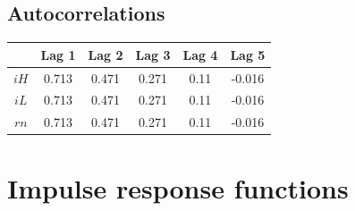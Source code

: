 \subsection{Autocorrelations}

\begin{tabular}{c|ccccc|}
  & Lag 1 & Lag 2 & Lag 3 & Lag 4 & Lag 5\\
\hline
${i\!H}$ & 0.713 & 0.471 & 0.271 & 0.11 & -0.016 \\
${i\!L}$ & 0.713 & 0.471 & 0.271 & 0.11 & -0.016 \\
${r\!n}$ & 0.713 & 0.471 & 0.271 & 0.11 & -0.016 \\
\hline
\end{tabular}



\pagebreak

\section{Impulse response functions}

